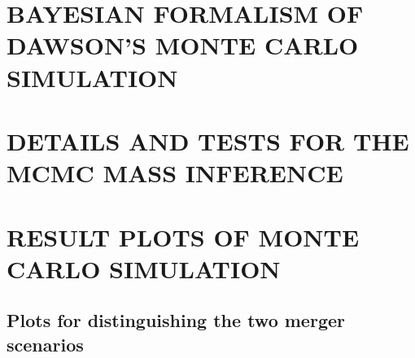 \section{BAYESIAN FORMALISM OF DAWSON'S MONTE CARLO SIMULATION}


\section{DETAILS AND TESTS FOR THE MCMC MASS INFERENCE}\label{app:MCMC}


\section{RESULT PLOTS OF MONTE CARLO SIMULATION} \label{app: plots}

\subsection{Plots for distinguishing the two merger scenarios}
\label{app: merger_scenarios}

\bsp 
\label{lastpage} 


